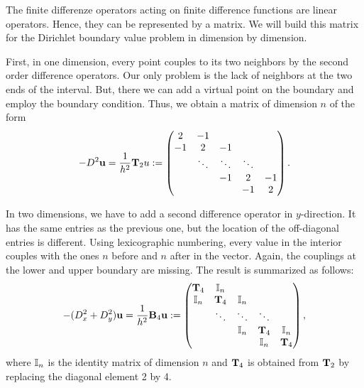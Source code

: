 \begin{remark}
  The finite differenze operators acting on finite difference
  functions are linear operators. Hence, they can be represented by a
  matrix. We will build this matrix for the Dirichlet boundary value
  problem in  dimension by
  dimension.

  First, in one dimension, every point couples to its two neighbors by
  the second order difference operators. Our only problem is the lack
  of neighbors at the two ends of the interval. But, there we can add
  a virtual point on the boundary and employ the boundary
  condition. Thus, we obtain a matrix of dimension $n$ of the form
  \begin{gather}
    -D^2 \mathbf u = \frac1{h^2} \mathbf T_2 u :=
    \begin{pmatrix}
      2 & -1 \\
      -1 & 2 & -1\\
      &\ddots & \ddots & \ddots \\
      &&-1 & 2 & -1\\
      &&& -1 & 2
    \end{pmatrix}.
  \end{gather}

  In two dimensions, we have to add a second difference operator in
  $y$-direction. It has the same entries as the previous one, but the
  location of the off-diagonal entries is different. Using
  lexicographic numbering, every value in the interior couples with
  the ones $n$ before and $n$ after in the vector. Again, the
  couplings at the lower and upper boundary are missing. The result is
  summarized as follows:
  \begin{gather}
    -(D_x^2+D_y^2) \mathbf u = \frac1{h^2} \mathbf B_4 \mathbf u :=
    \begin{pmatrix}
      \mathbf T_4 & \mathbb I_n \\
      \mathbb I_n & \mathbf T_4 & \mathbb I_n \\
      &\ddots & \ddots & \ddots \\
      &&\mathbb I_n & \mathbf T_4 & \mathbb I_n \\
      &&&\mathbb I_n & \mathbf T_4 \\
    \end{pmatrix},
  \end{gather}
  where $\mathbb I_n$ is the identity matrix of dimension $n$ and $\mathbf T_4$
  is obtained from $\mathbf T_2$ by replacing the diagonal element 2 by 4.


\end{remark}
